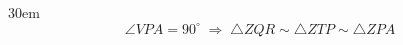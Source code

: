 \documentclass[border=4pt]{standalone}
\begin{document}
\begin{varwidth}{30em}
\large
\[ \angle VPA = 90^\circ \;\Rightarrow\; \triangle ZQR \sim \triangle ZTP \sim \triangle ZPA \]

\end{varwidth}
\end{document}
